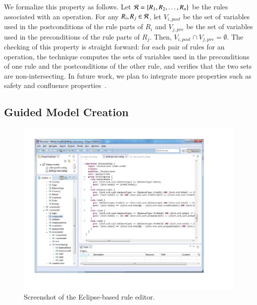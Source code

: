 We formalize this property as follows. Let ${\cal R} = \{R_1, R_2, \ldots,
R_n\}$ be the rules associated with an operation. For any $R_i, R_j \in {\cal
  R}$, let $V_{i, \mathit{post}}$ be the set of variables used in the
postconditions of the rule parts of $R_i$ and $V_{j, \mathit{pre}}$ be the set
of variables used in the preconditions of the rule parts of $R_j$. Then, $V_{i,
  \mathit{post}} \cap V_{j, \mathit{pre}} = \emptyset$. The checking of this
property is straight forward: for each pair of rules for an operation, the
technique computes the sets of variables used in the preconditions of one rule
and the postconditions of the other rule, and verifies that the two sets are
non-intersecting. In future work, we plan to integrate more properties such
as safety and confluence properties~\cite{DBLP:conf/icst/BerstelL10}. 

\subsection{Guided Model Creation}

\begin{figure}[t]
\centering
\includegraphics[trim=43 65 114 36,clip,width=\columnwidth]{figs/rule-editor.pdf}
\vspace*{-13pt}
\caption{Screenshot of the Eclipse-based rule editor.}
\vspace*{-0pt}
\label{fig:rule-editor}
\end{figure}

